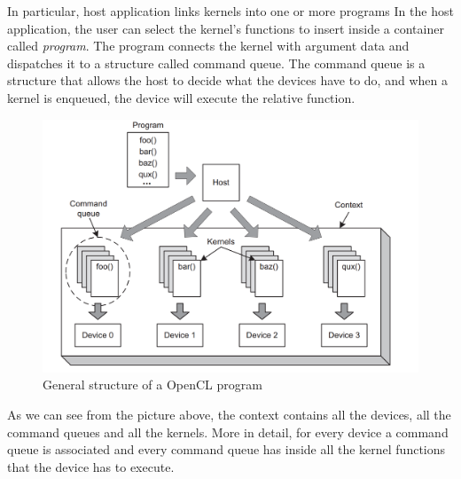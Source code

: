 In particular, host application links kernels into one or more
programs In the host application, the user can select the kernel's
functions to insert inside a container called \emph{program}.  The
program connects the kernel with argument data and dispatches it to a
structure called command queue.  The command queue is a structure that
allows the host to decide what the devices have to do, and when a
kernel is enqueued, the device will execute the relative function.

\begin{figure}[htp]
  \begin{center}
    \includegraphics[width=12cm]{./images/OpenCAL-CL/kernelDistribution}
    \caption{General structure of a OpenCL program}
    \label{fig:GeneralStructure}
  \end{center}
\end{figure}

As we can see from the picture above, the context contains all the
devices, all the command queues and all the kernels.  More in detail,
for every device a command queue is associated and every command queue
has inside all the kernel functions that the device has to execute.


